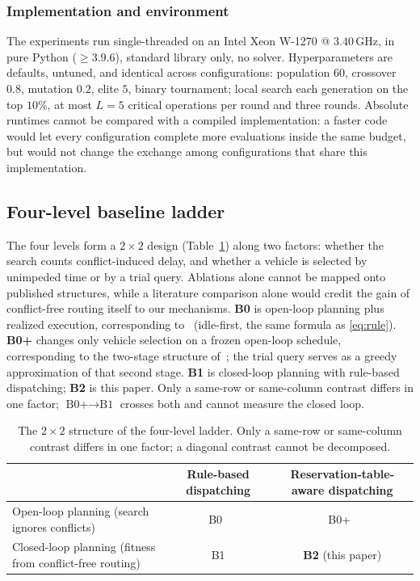 \documentclass[manuscript,screen,review]{acmart}
\begin{document}
\subsubsection{Implementation and environment}
\label{sec:impl}
The experiments run single-threaded on an Intel Xeon W-1270 @ $3.40$\,GHz, in pure Python ($\ge 3.9.6$), standard library only, no solver.
Hyperparameters are defaults, untuned, and identical across configurations: population $60$, crossover $0.8$, mutation $0.2$, elite $5$, binary tournament; local search each generation on the top $10\%$, at most $L=5$ critical operations per round and three rounds.
Absolute runtimes cannot be compared with a compiled implementation: a faster code would let every configuration complete more evaluations inside the same budget, but would not change the exchange among configurations that share this implementation.

\subsection{Four-level baseline ladder}
\label{sec:arms}

The four levels form a $2\times2$ design (Table~\ref{tab:arms}) along two factors: whether the search counts conflict-induced delay, and whether a vehicle is selected by unimpeded time or by a trial query.
Ablations alone cannot be mapped onto published structures, while a literature comparison alone would credit the gain of conflict-free routing itself to our mechanisms.
\textbf{B0} is open-loop planning plus realized execution, corresponding to~\cite{li2026framework} (idle-first, the same formula as \eqref{eq:rule}).
\textbf{B0+} changes only vehicle selection on a frozen open-loop schedule, corresponding to the two-stage structure of~\cite{sun2023integrated}; the trial query serves as a greedy approximation of that second stage.
\textbf{B1} is closed-loop planning with rule-based dispatching; \textbf{B2} is this paper.
Only a same-row or same-column contrast differs in one factor; $\text{B0+}\to\text{B1}$ crosses both and cannot measure the closed loop.

\begin{table}[t]
\caption{The $2\times2$ structure of the four-level ladder.
Only a same-row or same-column contrast differs in one factor; a diagonal contrast cannot be decomposed.}
\label{tab:arms}
\footnotesize
\begin{tabular}{@{}lcc@{}}
\toprule
 & Rule-based dispatching & Reservation-table-aware dispatching \\
\midrule
Open-loop planning (search ignores conflicts) & B0~\cite{li2026framework} & B0+~\cite{sun2023integrated} \\
Closed-loop planning (fitness from conflict-free routing) & B1 & \textbf{B2} (this paper) \\
\bottomrule
\end{tabular}
\end{table}
\end{document}
